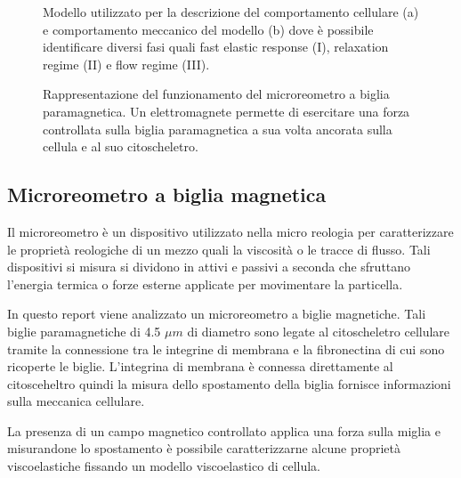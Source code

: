 \begin{figure}[t!]
	\begin{subfigure}{0.5\linewidth}
		\centering
		\footnotesize{
			\def\svgwidth{0.9\linewidth}
			}
		\caption{}
		\label{fig:mechanical}
	\end{subfigure}\hfill
	\begin{subfigure}{0.5\linewidth}
		\centering
		\footnotesize{
			\def\svgwidth{0.9\linewidth}
			}
		\caption{}
		\label{fig:mechanical1}
	\end{subfigure}\hfill
	\caption{Modello utilizzato per la descrizione del comportamento cellulare (a) e comportamento meccanico del modello (b) dove è possibile identificare diversi fasi quali fast elastic response (I), relaxation regime (II) e flow regime (III).}
\end{figure}
\begin{figure}[b!]
	\centering
	\footnotesize{
	 \def\svgwidth{\linewidth}
	 }
	\caption{Rappresentazione del funzionamento del microreometro a biglia paramagnetica. Un elettromagnete permette di esercitare una forza controllata sulla biglia paramagnetica a sua volta ancorata sulla cellula e al suo citoscheletro.}
	\label{fig:system}
\end{figure}



\subsection{Microreometro a biglia magnetica}

Il microreometro è un dispositivo utilizzato nella micro reologia per caratterizzare le proprietà reologiche di un mezzo quali la viscosità o le tracce di flusso. Tali dispositivi si misura si dividono in attivi e passivi a seconda che sfruttano l'energia termica o forze esterne applicate per movimentare la particella.

In questo report viene analizzato un microreometro a biglie magnetiche. Tali biglie paramagnetiche di 4.5 $\mu m$ di diametro sono legate al citoscheletro cellulare tramite la connessione tra le integrine di membrana e la fibronectina di cui sono ricoperte le biglie. L'integrina di membrana è connessa direttamente al citosceheltro quindi la misura dello spostamento della biglia fornisce informazioni sulla meccanica cellulare.

La presenza di un campo magnetico controllato applica una forza sulla miglia e misurandone lo spostamento è possibile caratterizzarne alcune proprietà viscoelastiche \cite{bausch_local_1998} fissando un modello viscoelastico di cellula.

